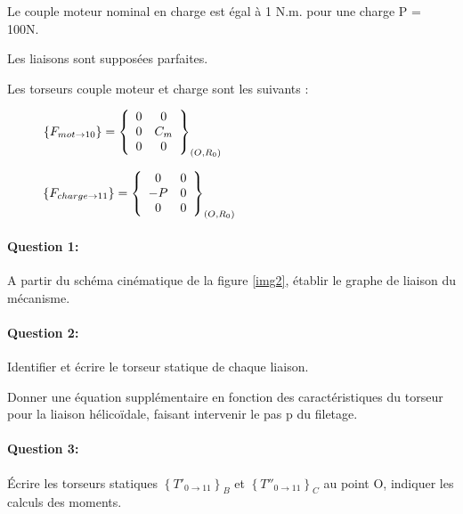 Le couple moteur nominal en charge est égal à 1 N.m. pour une charge P = 100N.

Les liaisons sont supposées parfaites.

Les torseurs couple moteur et charge sont les suivants :

\begin{figure}[!h]
  \begin{minipage}{0.35\linewidth}
  \begin{math}
  \left\{F_{mot \rightarrow 10}\right\}=\left\{
  \begin{array}{c c}
  0 & 0 \\
  0 & C_m \\
  0 & 0
  \end{array}\right\}_{(O,R_0)}
  \end{math}
  \end{minipage}
  \hfill
  \begin{minipage}{0.60\linewidth}
  \begin{math}
  \left\{F_{charge \rightarrow 11}\right\}=\left\{
  \begin{array}{c c}
  0 & 0 \\
  -P & 0 \\
  0 & 0
  \end{array}\right\}_{(O,R_0)}
  \end{math}
\end{minipage}
\end{figure}

\paragraph{Question 1:} A partir du schéma cinématique de la figure \ref{img2}, établir le graphe de liaison du mécanisme.

\paragraph{Question 2:} Identifier et écrire le torseur statique de chaque liaison.

Donner une équation supplémentaire en fonction des caractéristiques du torseur pour la liaison hélicoïdale, faisant intervenir le pas p du filetage.

\paragraph{Question 3:} Écrire les torseurs statiques $\left\{T'_{0 \rightarrow 11}\right\}_B$ et $\left\{T''_{0 \rightarrow 11}\right\}_C$ au point O, indiquer les calculs des moments.

